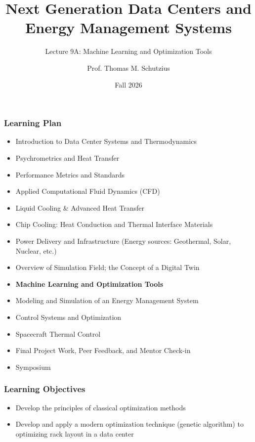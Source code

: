 \documentclass[aspectratio=169,10pt,xcolor={table,dvipsnames},t]{beamer}
\title[lecture 09]{Next Generation Data Centers and Energy Management Systems}
\subtitle{Lecture 9A: Machine Learning and Optimization Tools}
\author{Prof. Thomas M. Schutzius}
\institute{Department of Mechanical Engineering}
\date{Fall 2026}
\begin{document}
\begin{frame}
  \titlepage
\end{frame}


{
\smallframetitle %

\begin{frame}
	\frametitle{Learning Plan}
	\begin{itemize}
		\item Introduction to Data Center Systems and Thermodynamics 
		\item Psychrometrics and Heat Transfer
		\item Performance Metrics and Standards
		\item Applied Computational Fluid Dynamics (CFD)
		\item Liquid Cooling \& Advanced Heat Transfer
		\item Chip Cooling: Heat Conduction and Thermal Interface Materials
		\item Power Delivery and Infrastructure (Energy sources: Geothermal, Solar, Nuclear, etc.)
		\item Overview of Simulation Field; the Concept of a Digital Twin
		\item \textbf{Machine Learning and Optimization Tools}
		\item Modeling and Simulation of an Energy Management System 
		\item Control Systems and Optimization 
		\item Spacecraft Thermal Control
		\item Final Project Work, Peer Feedback, and Mentor Check-in 
		\item Symposium 
	\end{itemize}		
\end{frame}

\begin{frame}
	\frametitle{Learning Objectives} 
		\begin{itemize}
			\item Develop the principles of classical optimization methods
			\item Develop and apply a modern optimization technique (genetic algorithm) to optimizing rack layout in a data center
		\end{itemize}		
\end{frame}


}
\end{document}
